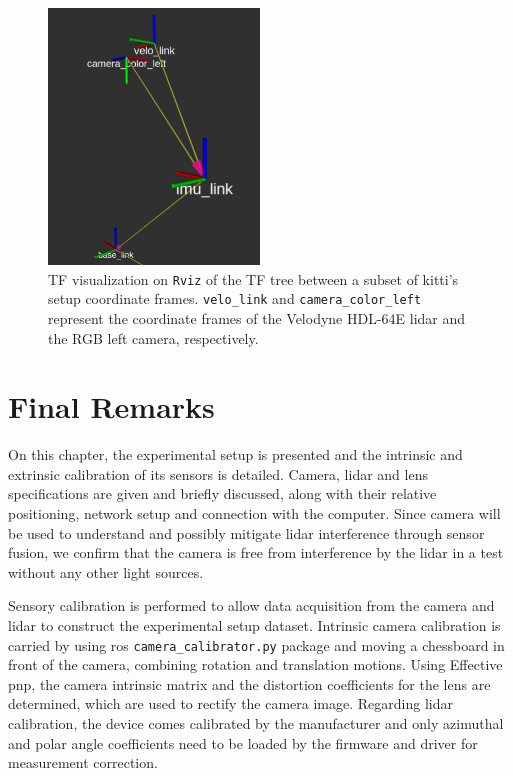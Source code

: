 \begin{figure}[H]
	\centering
	\includegraphics[width=0.5\textwidth]{img/KITTI/tf.png}
	\caption{TF visualization on \texttt{Rviz} of the TF tree between a subset of \ac{kitti}'s setup coordinate frames. \texttt{velo\_link} and \texttt{camera\_color\_left} represent the coordinate frames of the Velodyne HDL-64E \ac{lidar} and the RGB left camera, respectively.}
	\label{fig:kitti-tf-frames}
\end{figure}

\section{Final Remarks}
\label{sec:calibration:final-remarks}

On this chapter, the experimental setup is presented and the intrinsic and extrinsic calibration of its sensors is detailed. Camera, \ac{lidar} and lens specifications are given and briefly discussed, along with their relative positioning, network setup and connection with the computer. Since camera will be used to understand and possibly mitigate \ac{lidar} interference through sensor fusion, we confirm that the camera is free from interference by the \ac{lidar} in a test without any other light sources.

Sensory calibration is performed to allow data acquisition from the camera and \ac{lidar} to construct the experimental setup dataset. Intrinsic camera calibration is carried by using \ac{ros} \texttt{camera\_calibrator.py} package and moving a chessboard in front of the camera, combining rotation and translation motions. Using Effective \acl{pnp}, the camera intrinsic matrix and the distortion coefficients for the lens are determined, which are used to rectify the camera image. Regarding \ac{lidar} calibration, the device comes calibrated by the manufacturer and only azimuthal and polar angle coefficients need to be loaded by the firmware and driver for measurement correction.

